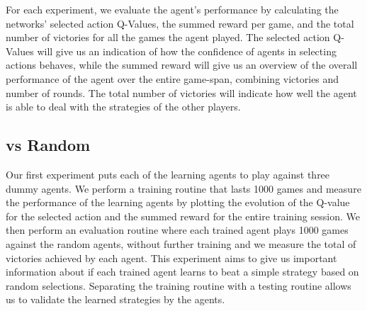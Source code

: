 \documentclass[a4paper,conference]{IEEEtran}
\begin{document}
For each experiment, we evaluate the agent's performance by calculating the networks' selected action Q-Values, the summed reward per game, and the total number of victories for all the games the agent played. The selected action Q-Values will give us an indication of how the confidence of agents in selecting actions behaves, while the summed reward will give us an overview of the overall performance of the agent over the entire game-span, combining victories and number of rounds. The total number of victories will indicate how well the agent is able to deal with the strategies of the other players. 

\subsection{vs Random}

Our first experiment puts each of the learning agents to play against three dummy agents. We perform a training routine that lasts 1000 games and measure the performance of the learning agents by plotting the evolution of the Q-value for the selected action and the summed reward for the entire training session. We then perform an evaluation routine where each trained agent plays 1000 games against the random agents, without further training and we measure the total of victories achieved by each agent. This experiment aims to give us important information about if each trained agent learns to beat a simple strategy based on random selections. Separating the training routine with a testing routine allows us to validate the learned strategies by the agents.

\end{document}
